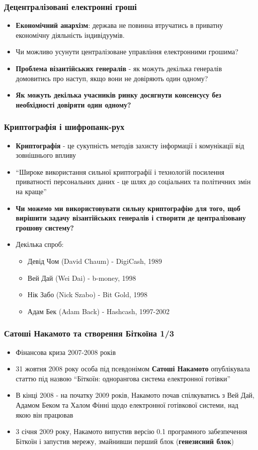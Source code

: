 \documentclass{beamer}
\begin{document}
\begin{frame}
  \frametitle{Децентралізовані електронні гроші}
  \begin{itemize}
  \item \textbf{Економічний анархізм}: держава не повинна втручатись в приватну
    економічну діяльність індивідуумів.
  \item Чи можливо усунути централізоване управління електронними грошима?
  \item \textbf{Проблема візантійських генералів} - як можуть декілька генералів
    домовитись про наступ, якщо вони не довіряють один одному?
  \item \textbf{Як можуть декілька учасників ринку досягнути консенсусу без
      необхідності довіряти один одному?}
  \end{itemize}
\end{frame}

\begin{frame}
  \frametitle{Криптографія і шифропанк-рух}
  \begin{itemize}
  \item \textbf{Криптографія} - це сукупність методів захисту інформації і
    комунікації від зовнішнього впливу
  \item ``Широке використання сильної криптографії і технологій посилення
    приватності персональних даних - це шлях до соціальних та політичних змін на
    краще''
  \item \textbf{Чи можемо ми використовувати сильну криптографію для того, щоб
      вирішити задачу візантійських генералів і створити де централізовану
      грошову систему?}
  \item Декілька спроб:
    \begin{itemize}
    \item Девід Чом (David Chaum) - DigiCash, 1989
    \item Вей Дай (Wei Dai) - b-money, 1998
    \item Нік Забо (Nick Szabo) - Bit Gold, 1998
    \item Адам Бек (Adam Back) - Hashcash, 1997-2002
    \end{itemize}
  \end{itemize}
\end{frame}

\begin{frame}
  \frametitle{Сатоші Накамото та створення Біткоїна 1/3}
  \begin{itemize}
  \item Фінансова криза 2007-2008 років
  \item 31 жовтня 2008 року особа під псевдонімом \textbf{Сатоші Накамото}
    опублікувала статтю під назвою ``Біткоїн: однорангова система електронної готівки''
  \item В кінці 2008 - на початку 2009 років, Накамото почав спілкуватись з Вей
    Дай, Адамом Беком та Халом Фінні щодо електронної готівкової системи, над
    якою він працював
  \item 3 січня 2009 року, Накамото випустив версію 0.1 програмного забезпечення
    Біткоїн і запустив мережу, змайнивши перший блок (\textbf{генезисний блок})
  \end{itemize}
\end{frame}
\end{document}
